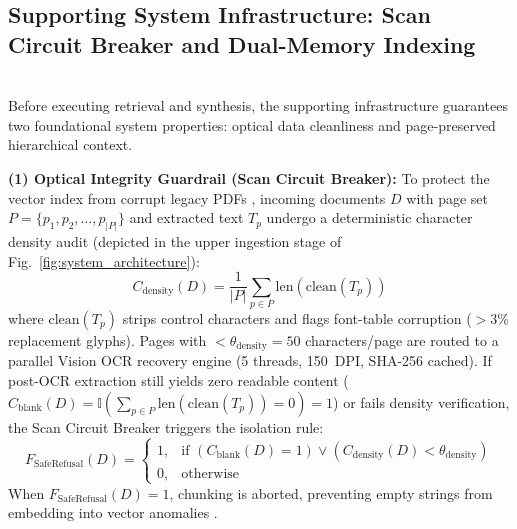 \documentclass[10pt]{SPIIRAS_Proceedings}
\begin{document}
\subsection{Supporting System Infrastructure: Scan Circuit Breaker and Dual-Memory Indexing}~\\
\hspace*{\parindent}Before executing retrieval and synthesis, the supporting infrastructure guarantees two foundational system properties: optical data cleanliness and page-preserved hierarchical context.

\textbf{(1) Optical Integrity Guardrail (Scan Circuit Breaker):} To protect the vector index from corrupt legacy PDFs \cite{gao2023retrieval,yan2024corrective}, incoming documents $D$ with page set $P = \{p_1, p_2, \dots, p_{|P|}\}$ and extracted text $T_p$ undergo a deterministic character density audit (depicted in the upper ingestion stage of Fig.~\ref{fig:system_architecture}):
\begin{equation}
C_{\text{density}}(D) = \frac{1}{|P|} \sum_{p \in P} \text{len}(\text{clean}(T_p))
\label{eq:cdensity}
\end{equation}
where $\text{clean}(T_p)$ strips control characters and flags font-table corruption ($>3\%$ replacement glyphs). Pages with $< \theta_{\text{density}} = 50$ characters/page are routed to a parallel Vision OCR recovery engine (5 threads, 150~DPI, SHA-256 cached). If post-OCR extraction still yields zero readable content ($C_{\text{blank}}(D) = \mathbb{I}(\sum_{p \in P} \text{len}(\text{clean}(T_p)) = 0) = 1$) or fails density verification, the Scan Circuit Breaker triggers the isolation rule:
\begin{equation}
F_{\text{SafeRefusal}}(D) = 
\begin{cases} 
1, & \text{if } (C_{\text{blank}}(D) = 1) \lor (C_{\text{density}}(D) < \theta_{\text{density}}) \\
0, & \text{otherwise}
\end{cases}
\label{eq:saferefusal}
\end{equation}
When $F_{\text{SafeRefusal}}(D) = 1$, chunking is aborted, preventing empty strings from embedding into vector anomalies \cite{wang2022text}.
\end{document}
